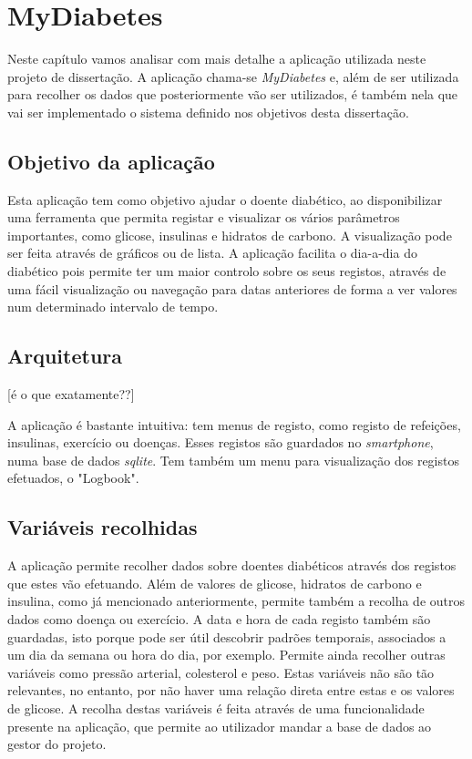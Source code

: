 \chapter{MyDiabetes}\label{chap:syst}

Neste capítulo vamos analisar com mais detalhe a aplicação utilizada neste projeto de dissertação. A aplicação chama-se \textit{MyDiabetes} e, além de ser utilizada para recolher os dados que posteriormente vão ser utilizados, é também nela que vai ser implementado o sistema definido nos objetivos desta dissertação. 

\section{Objetivo da aplicação}

Esta aplicação tem como objetivo ajudar o doente diabético, ao disponibilizar uma ferramenta que permita registar e visualizar os vários parâmetros importantes, como glicose, insulinas e hidratos de carbono. A visualização pode ser feita através de gráficos ou de lista. A aplicação facilita o dia-a-dia do diabético pois permite ter um maior controlo sobre os seus registos, através de uma fácil visualização ou navegação para datas anteriores de forma a ver valores num determinado intervalo de tempo.

\section{Arquitetura}

[é o que exatamente??]

A aplicação é bastante intuitiva: tem menus de registo, como registo de refeições, insulinas, exercício ou doenças. Esses registos são guardados no \textit{smartphone}, numa base de dados \textit{sqlite}. Tem também um menu para visualização dos registos efetuados, o "Logbook". 

\section{Variáveis recolhidas}

A aplicação permite recolher dados sobre doentes diabéticos através dos registos que estes vão efetuando. Além de valores de glicose, hidratos de carbono e insulina, como já mencionado anteriormente, permite também a recolha de outros dados como doença ou exercício. A data e hora de cada registo também são guardadas, isto porque pode ser útil descobrir padrões temporais, associados a um dia da semana ou hora do dia, por exemplo. Permite ainda recolher outras variáveis como pressão arterial, colesterol e peso. Estas variáveis não são tão relevantes, no entanto, por não haver uma relação direta entre estas e os valores de glicose. A recolha destas variáveis é feita através de uma funcionalidade presente na aplicação, que permite ao utilizador mandar a base de dados ao gestor do projeto. 





